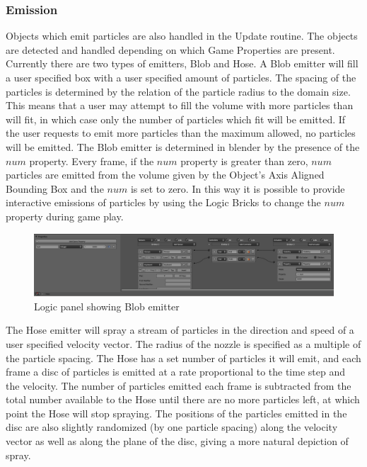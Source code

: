 \subsubsection{Emission}
Objects which emit particles are also handled in the Update routine. The
objects are detected and handled depending on which Game Properties are
present. Currently there are two types of emitters, Blob and Hose. A Blob
emitter will fill a user specified box with a user specified amount of
particles. The spacing of the particles is determined by the relation of the
particle radius to the domain size. This means that a user may attempt to fill
the volume with more particles than will fit, in which case only the number of
particles which fit will be emitted. If the user requests to emit more
particles than the maximum allowed, no particles will be emitted.
The Blob emitter is determined in blender by the presence of the $num$
property. Every frame, if the $num$ property is greater than zero, $num$
particles are emitted from the volume given by the Object's Axis Aligned
Bounding Box and the $num$ is set to zero. In this way it is possible to
provide interactive emissions of particles by using the Logic Bricks to change
the $num$ property during game play.

\begin{figure}[!htc]
 		\centering
		\includegraphics[scale=0.22]{figures/ui_emitter.png}
        \caption{ Logic panel showing Blob emitter }
		\label{fig:ui_emitter}
\end{figure}



The Hose emitter will spray a stream of particles in the direction and speed of
a user specified velocity vector. The radius of the nozzle is specified as a
multiple of the particle spacing. The Hose has a set number of particles it
will emit, and each frame a disc of particles is emitted at a rate proportional
to the time step and the velocity. The number of particles emitted each frame
is subtracted from the total number available to the Hose until there are no
more particles left, at which point the Hose will stop spraying. The positions
of the particles emitted in the disc are also slightly randomized (by one
particle spacing) along the velocity vector as well as along the plane of the
disc, giving a more natural depiction of spray.

